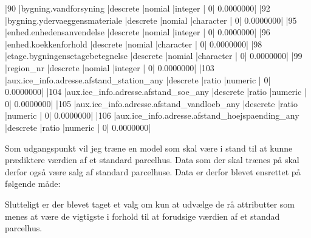 \documentclass{report}
\begin{document}
\begin{Schunk}
\begin{Soutput}
|90  |bygning.vandforsyning                                         |descrete           |nomial         |integer         |              0|          0.0000000|
|92  |bygning.ydervaeggensmateriale                                 |descrete           |nomial         |character       |              0|          0.0000000|
|95  |enhed.enhedensanvendelse                                      |descrete           |nomial         |integer         |              0|          0.0000000|
|96  |enhed.koekkenforhold                                          |descrete           |nomial         |character       |              0|          0.0000000|
|98  |etage.bygningensetagebetegnelse                               |descrete           |nomial         |character       |              0|          0.0000000|
|99  |region_nr                                                     |descrete           |nomial         |integer         |              0|          0.0000000|
|103 |aux.ice_info.adresse.afstand_station_any                      |descrete           |ratio          |numeric         |              0|          0.0000000|
|104 |aux.ice_info.adresse.afstand_soe_any                          |descrete           |ratio          |numeric         |              0|          0.0000000|
|105 |aux.ice_info.adresse.afstand_vandloeb_any                     |descrete           |ratio          |numeric         |              0|          0.0000000|
|106 |aux.ice_info.adresse.afstand_hoejspaending_any                |descrete           |ratio          |numeric         |              0|          0.0000000|
\end{Soutput}
\end{Schunk}

Som udgangspunkt vil jeg træne en model som skal være i stand til at kunne prædiktere værdien af et standard
parcelhus. Data som der skal trænes på skal derfor også være salg af standard parcelhuse.
Data er derfor blevet ensrettet på følgende måde:


Slutteligt er der blevet taget et valg om kun at udvælge de rå attributter som menes at være de vigtigste i
forhold til at forudsige værdien af et standad parcelhus.
\end{document}
